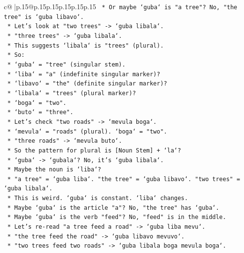 \documentclass{article}
\begin{document}
{\begin{supertabular}{c@{$\;$}|p{.15\linewidth}@{}p{.15\linewidth}p{.15\linewidth}p{.15\linewidth}p{.15\linewidth}p{.15\linewidth}}
{{{\texttt{        *   Or maybe `guba` is "a tree"? No, "the tree" is `guba libavo`.} \\
\texttt{        *   Let's look at "two trees" {-}> `guba libala`.} \\
\texttt{        *   "three trees" {-}> `guba libala`.} \\
\texttt{        *   This suggests `libala` is "trees" (plural).} \\
\texttt{        *   So:} \\
\texttt{            *   `guba` = "tree" (singular stem).} \\
\texttt{            *   `liba` = "a" (indefinite singular marker)?} \\
\texttt{            *   `libavo` = "the" (definite singular marker)?} \\
\texttt{            *   `libala` = "trees" (plural marker)?} \\
\texttt{            *   `boga` = "two".} \\
\texttt{            *   `buto` = "three".} \\
\texttt{        *   Let's check "two roads" {-}> `mevula boga`.} \\
\texttt{        *   `mevula` = "roads" (plural). `boga` = "two".} \\
\texttt{        *   "three roads" {-}> `mevula buto`.} \\
\texttt{        *   So the pattern for plural is {[}Noun Stem{]} + `la`?} \\
\texttt{        *   `guba` {-}> `gubala`? No, it's `guba libala`.} \\
\texttt{        *   Maybe the noun is `liba`?} \\
\texttt{        *   "a tree" = `guba liba`. "the tree" = `guba libavo`. "two trees" = `guba libala`.} \\
\texttt{        *   This is weird. `guba` is constant. `liba` changes.} \\
\texttt{        *   Maybe `guba` is the article "a"? No, "the tree" has `guba`.} \\
\texttt{        *   Maybe `guba` is the verb "feed"? No, "feed" is in the middle.} \\
\texttt{        *   Let's re{-}read "a tree feed a road" {-}> `guba liba mevu`.} \\
\texttt{        *   "the tree feed the road" {-}> `guba libavo mevuvo`.} \\
\texttt{        *   "two trees feed two roads" {-}> `guba libala boga mevula boga`.} \\
}}}
\end{supertabular}}
\end{document}

